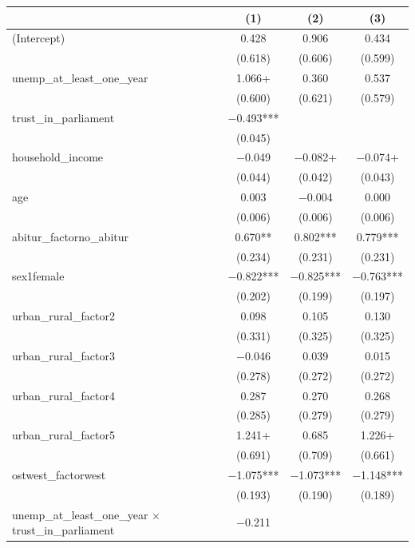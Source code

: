 \documentclass[
]{article}
\begin{document}
\begin{table}
\centering
\begin{tabular}[t]{lccc}
\toprule
  & (1) & (2) & (3)\\
\midrule
(Intercept) & \num{0.428} & \num{0.906} & \num{0.434}\\
 & (\num{0.618}) & (\num{0.606}) & (\num{0.599})\\
unemp\_at\_least\_one\_year & \num{1.066}+ & \num{0.360} & \num{0.537}\\
 & (\num{0.600}) & (\num{0.621}) & (\num{0.579})\\
trust\_in\_parliament & \num{-0.493}*** &  & \\
 & (\num{0.045}) &  & \\
household\_income & \num{-0.049} & \num{-0.082}+ & \num{-0.074}+\\
 & (\num{0.044}) & (\num{0.042}) & (\num{0.043})\\
age & \num{0.003} & \num{-0.004} & \num{0.000}\\
 & (\num{0.006}) & (\num{0.006}) & (\num{0.006})\\
abitur\_factorno\_abitur & \num{0.670}** & \num{0.802}*** & \num{0.779}***\\
 & (\num{0.234}) & (\num{0.231}) & (\num{0.231})\\
sex1female & \num{-0.822}*** & \num{-0.825}*** & \num{-0.763}***\\
 & (\num{0.202}) & (\num{0.199}) & (\num{0.197})\\
urban\_rural\_factor2 & \num{0.098} & \num{0.105} & \num{0.130}\\
 & (\num{0.331}) & (\num{0.325}) & (\num{0.325})\\
urban\_rural\_factor3 & \num{-0.046} & \num{0.039} & \num{0.015}\\
 & (\num{0.278}) & (\num{0.272}) & (\num{0.272})\\
urban\_rural\_factor4 & \num{0.287} & \num{0.270} & \num{0.268}\\
 & (\num{0.285}) & (\num{0.279}) & (\num{0.279})\\
urban\_rural\_factor5 & \num{1.241}+ & \num{0.685} & \num{1.226}+\\
 & (\num{0.691}) & (\num{0.709}) & (\num{0.661})\\
ostwest\_factorwest & \num{-1.075}*** & \num{-1.073}*** & \num{-1.148}***\\
 & (\num{0.193}) & (\num{0.190}) & (\num{0.189})\\
unemp\_at\_least\_one\_year × trust\_in\_parliament & \num{-0.211} &  & \\

\end{tabular}
\end{table}
\end{document}
